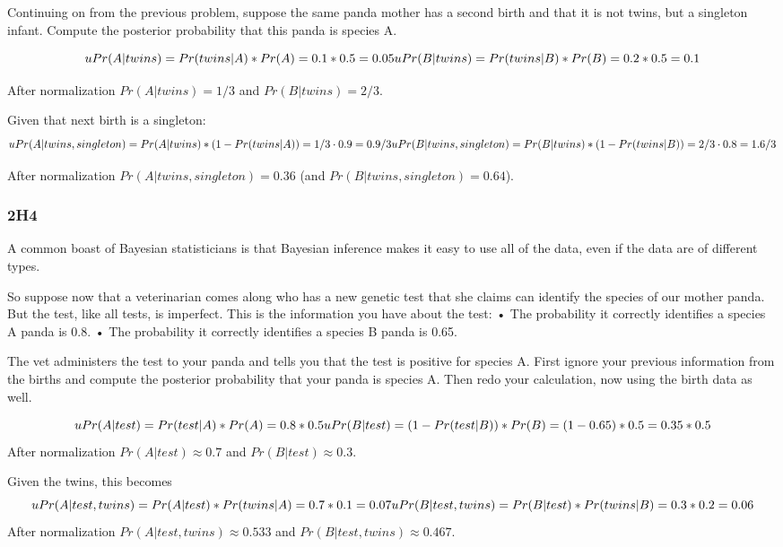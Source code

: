 \documentclass[
]{book}
\begin{document}
Continuing on from the previous problem, suppose the same panda mother has a second birth and that it is not twins, but a singleton infant. Compute the posterior probability that this panda is species A.

\[uPr(A | twins) = Pr(twins | A) * Pr(A) = 0.1 * 0.5 = 0.05 \\
uPr(B | twins) = Pr(twins | B) * Pr(B) = 0.2 * 0.5 = 0.1\]

After normalization \(Pr(A | twins) = 1/3\) and \(Pr(B | twins) = 2/3\).

Given that next birth is a singleton:
\[uPr(A | twins, singleton) = Pr(A | twins) * (1 - Pr(twins|A)) = 1/3 \cdot 0.9 = 0.9/3\\
uPr(B | twins, singleton) = Pr(B | twins) * (1 - Pr(twins|B)) = 2/3 \cdot 0.8 = 1.6/3\]

After normalization \(Pr(A | twins, singleton) = 0.36\) (and \(Pr(B | twins, singleton) = 0.64\)).

\hypertarget{h4}{%
\subsubsection*{2H4}\label{h4}}

A common boast of Bayesian statisticians is that Bayesian inference makes it easy to use all of the data, even if the data are of different types.

So suppose now that a veterinarian comes along who has a new genetic test that she claims can identify the species of our mother panda. But the test, like all tests, is imperfect. This is the information you have about the test:
• The probability it correctly identifies a species A panda is 0.8.
• The probability it correctly identifies a species B panda is 0.65.

The vet administers the test to your panda and tells you that the test is positive for species A. First ignore your previous information from the births and compute the posterior probability that your panda is species A. Then redo your calculation, now using the birth data as well.

\[uPr(A | test) = Pr(test | A) * Pr (A) = 0.8 * 0.5\\
uPr(B | test) = (1 - Pr(test | B)) * Pr (B) = (1 - 0.65) * 0.5 = 0.35 * 0.5\]
After normalization \(Pr(A | test) \approx 0.7\) and \(Pr(B | test) \approx 0.3\).

Given the twins, this becomes
\[uPr(A | test, twins) = Pr(A | test) * Pr(twins | A) = 0.7 * 0.1 = 0.07\\
uPr(B | test, twins) = Pr(B | test) * Pr(twins | B) = 0.3 * 0.2 = 0.06\]
After normalization \(Pr(A | test, twins) \approx 0.533\) and \(Pr(B | test, twins) \approx 0.467\).
\end{document}
